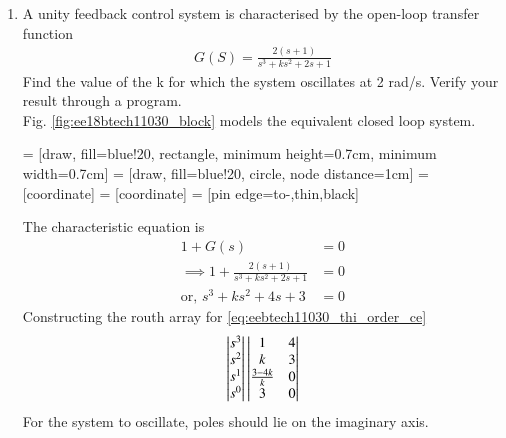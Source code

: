 \begin{enumerate}[label=\thesubsection.\arabic*.,ref=\thesubsection.\theenumi]
\item A unity feedback control system is characterised by the open-loop transfer function
\begin{align}
G(S) = \frac{2(s+1)}{s^3 + ks^2 + 2s +1}
\end{align}
Find the value of the k for which the system oscillates at 2 rad/s.  Verify your result through a program.\\
%
\solution Fig. \ref{fig:ee18btech11030_block} models the equivalent closed loop system. 

 = [draw, fill=blue!20, rectangle, 
    minimum height=0.7cm, minimum width=0.7cm]
 = [draw, fill=blue!20, circle, node distance=1cm]
 = [coordinate]
 = [coordinate]
 = [pin edge={to-,thin,black}]



%
The characteristic equation is
\begin{align}
1 + G(s) &= 0
\\
\implies 1 + \frac{2(s+1)}{s^3 + ks^2 + 2s +1} &= 0
\\
\text{or, } s^3+ks^2+4s+3 &= 0 
\label{eq:eebtech11030_thi_order_ce}
\end{align}
Constructing the routh array for \eqref{eq:eebtech11030_thi_order_ce}
\begin{align}
\begin{vmatrix}s^3\\s^2\\s^1 \\ s^0\end{vmatrix}
\begin{vmatrix}1 & 4 \\ k & 3 \\  \frac{3-4k}{k} & 0\\ 3 & 0\end{vmatrix} 
\end{align}
For the system to oscillate, poles should lie on the imaginary axis. 


\end{enumerate}
